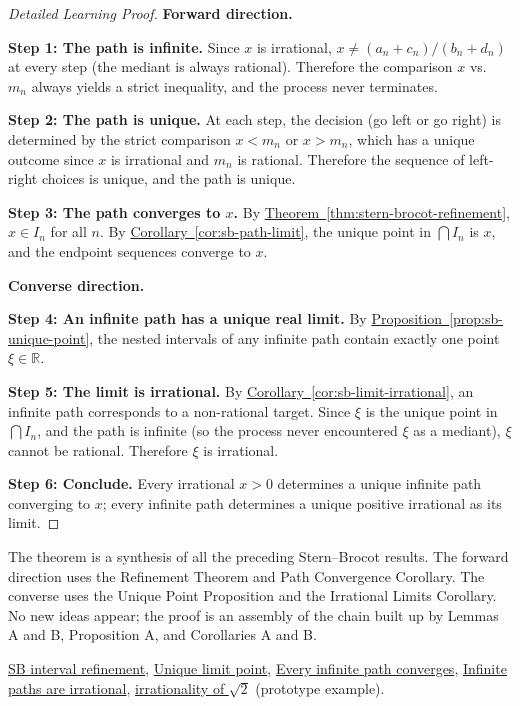 \begin{proof}[Detailed Learning Proof]
\LRAProofBodyStart
\textbf{Forward direction.}

\textbf{Step 1: The path is infinite.}
Since $x$ is irrational, $x \neq (a_n + c_n)/(b_n + d_n)$ at every
step (the mediant is always rational).  Therefore the comparison $x$ vs.\ 
$m_n$ always yields a strict inequality, and the process never terminates.

\textbf{Step 2: The path is unique.}
At each step, the decision (go left or go right) is determined by the
strict comparison $x < m_n$ or $x > m_n$, which has a unique outcome
since $x$ is irrational and $m_n$ is rational.  Therefore the sequence
of left-right choices is unique, and the path is unique.

\textbf{Step 3: The path converges to $x$.}
By \hyperref[thm:stern-brocot-refinement]{Theorem~\ref*{thm:stern-brocot-refinement}},
$x \in I_n$ for all $n$.  By
\hyperref[cor:sb-path-limit]{Corollary~\ref*{cor:sb-path-limit}},
the unique point in $\bigcap I_n$ is $x$, and the endpoint sequences
converge to $x$.

\textbf{Converse direction.}

\textbf{Step 4: An infinite path has a unique real limit.}
By \hyperref[prop:sb-unique-point]{Proposition~\ref*{prop:sb-unique-point}},
the nested intervals of any infinite path contain exactly one point
$\xi \in \mathbb{R}$.

\textbf{Step 5: The limit is irrational.}
By \hyperref[cor:sb-limit-irrational]{Corollary~\ref*{cor:sb-limit-irrational}},
an infinite path corresponds to a non-rational target.  Since $\xi$ is
the unique point in $\bigcap I_n$, and the path is infinite (so the
process never encountered $\xi$ as a mediant), $\xi$ cannot be rational.
Therefore $\xi$ is irrational.

\textbf{Step 6: Conclude.}
Every irrational $x > 0$ determines a unique infinite path converging to
$x$; every infinite path determines a unique positive irrational as its
limit.
\end{proof}

\begin{remark*}
The theorem is a synthesis of all the preceding Stern--Brocot results.
The forward direction uses the Refinement Theorem and Path Convergence
Corollary.  The converse uses the Unique Point Proposition and the
Irrational Limits Corollary.  No new ideas appear; the proof is an
assembly of the chain built up by Lemmas A and B, Proposition A, and
Corollaries A and B.
\end{remark*}

\begin{dependencies}
\hyperref[thm:stern-brocot-refinement]{SB interval refinement},
\hyperref[prop:sb-unique-point]{Unique limit point},
\hyperref[cor:sb-path-limit]{Every infinite path converges},
\hyperref[cor:sb-limit-irrational]{Infinite paths are irrational},
\hyperref[thm:sqrt2-irrational]{irrationality of $\sqrt{2}$} (prototype example).
\end{dependencies}

\clearpage
